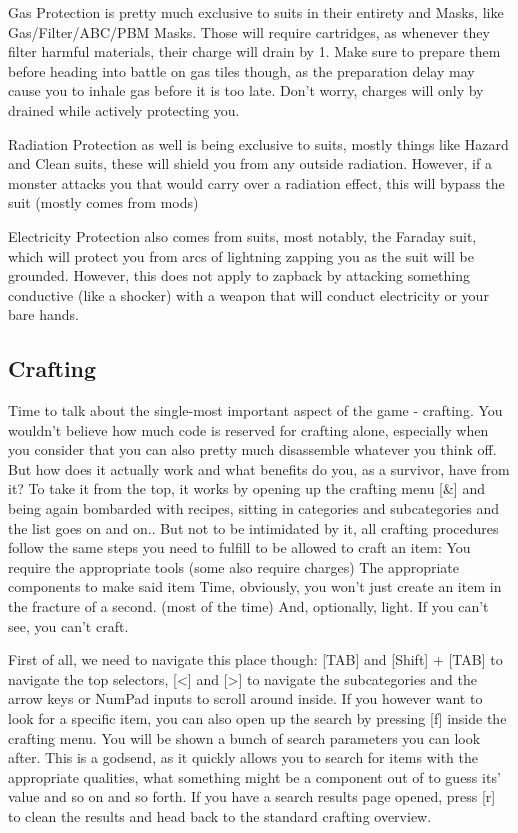 \documentclass[11pt]{report}
\begin{document}
Gas Protection is pretty much exclusive to suits in their entirety and Masks, like Gas/Filter/ABC/PBM Masks. Those will require cartridges, as whenever they filter harmful materials, their charge will drain by 1. Make sure to prepare them before heading into battle on gas tiles though, as the preparation delay may cause you to inhale gas before it is too late. Don't worry, charges will only by drained while actively protecting you.

Radiation Protection as well is being exclusive to suits, mostly things like Hazard and Clean suits, these will shield you from any outside radiation. However, if a monster attacks you that would carry over a radiation effect, this will bypass the suit (mostly comes from mods)

Electricity Protection also comes from suits, most notably, the Faraday suit, which will protect you from arcs of lightning zapping you as the suit will be grounded. However, this does not apply to zapback by attacking something conductive (like a shocker) with a weapon that will conduct electricity or your bare hands.

\subsection{Crafting}
Time to talk about the single-most important aspect of the game - crafting.
You wouldn't believe how much code is reserved for crafting alone, especially when you consider that you can also pretty much disassemble whatever you think off. But how does it actually work and what benefits do you, as a survivor, have from it?
To take it from the top, it works by opening up the crafting menu [\&] and being again bombarded with recipes, sitting in categories and subcategories and the list goes on and on.. But not to be intimidated by it, all crafting procedures follow the same steps you need to fulfill to be allowed to craft an item:
You require the appropriate tools (some also require charges)
The appropriate components to make said item
Time, obviously, you won't just create an item in the fracture of a second. (most of the time)
And, optionally, light. If you can't see, you can't craft.

First of all, we need to navigate this place though: [TAB] and [Shift] + [TAB] to navigate the top selectors, [<] and [>] to navigate the subcategories and the arrow keys or NumPad inputs to scroll around inside.
If you however want to look for a specific item, you can also open up the search by pressing [f] inside the crafting menu. You will be shown a bunch of search parameters you can look after. This is a godsend, as it quickly allows you to search for items with the appropriate qualities, what something might be a component out of to guess its' value and so on and so forth. If you have a search results page opened, press [r] to clean the results and head back to the standard crafting overview.
\end{document}
